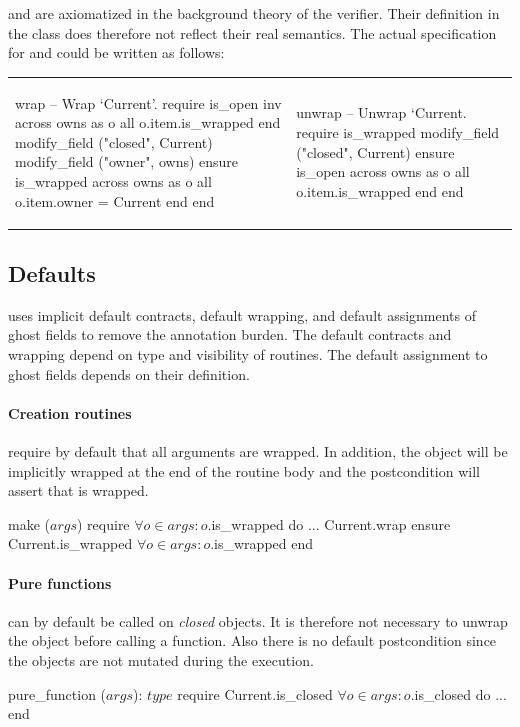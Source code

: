  and  are axiomatized in the background theory of the verifier. Their definition in the class  does therefore not reflect their real semantics. The actual specification for  and  could be written as follows:

\noindent\begin{tabular}{ll}
{\begin{erunning}[basicstyle=\scriptsize,numbers=left]
wrap
		-- Wrap `Current'.
	require
		is_open
		inv
		across owns as o all o.item.is_wrapped end
		modify_field ("closed", Current)
		modify_field ("owner", owns)
	ensure
		is_wrapped
		across owns as o all o.item.owner = Current end
	end
\end{erunning}}
&
\hspace{4mm}
{\begin{erunning}[basicstyle=\scriptsize,numbers=left,firstnumber=last]
unwrap
		-- Unwrap `Current.
	require
		is_wrapped
		modify_field ("closed", Current)
	ensure
		is_open
		across owns as o all 
		       o.item.is_wrapped end
	end
\end{erunning}}
\end{tabular}


\subsection{Defaults}

\AutoProof uses implicit default contracts, default wrapping, and default assignments of ghost fields to remove the annotation burden. The default contracts and wrapping depend on type and visibility of routines. The default assignment to ghost fields depends on their definition.

\paragraph{Creation routines} require by default that all arguments are wrapped. In addition, the  object will be implicitly wrapped at the end of the routine body and the postcondition will assert that  is wrapped.
\begin{erunning}
make ($args$)
	require
		$\forall o\in args : o$.is_wrapped
	do
		...
		Current.wrap
	ensure
		Current.is_wrapped
		$\forall o\in args : o$.is_wrapped
	end
\end{erunning}

\paragraph{Pure functions} can by default be called on \emph{closed} objects. It is therefore not necessary to unwrap the object before calling a function. Also there is no default postcondition since the objects are not mutated during the execution.
\begin{erunning}
pure_function ($args$): $type$
	require
		Current.is_closed
		$\forall o\in args : o$.is_closed
	do ...	end
\end{erunning}

